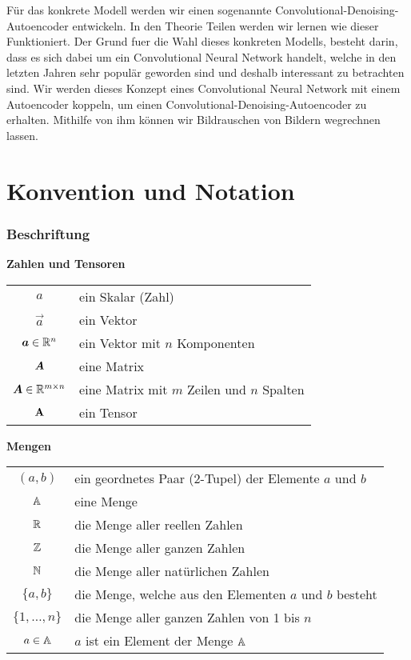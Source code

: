 Für das konkrete Modell werden wir einen sogenannte
Convolutional-Denoising-Autoencoder entwickeln. In den Theorie Teilen werden wir
lernen wie dieser Funktioniert. Der Grund fuer die Wahl dieses konkreten Modells,
besteht darin, dass es sich dabei um ein Convolutional Neural Network handelt,
welche in den letzten Jahren sehr populär geworden sind und deshalb interessant
zu betrachten sind. Wir werden dieses Konzept eines Convolutional Neural Network
mit einem Autoencoder koppeln, um einen Convolutional-Denoising-Autoencoder zu
erhalten. Mithilfe von ihm können wir Bildrauschen von Bildern wegrechnen lassen.


\chapter*{Konvention und Notation}

\subsection*{Beschriftung}

\begin{center}\textbf{Zahlen und Tensoren}\end{center}
\begin{tabular}{cl}
  $a$ & ein Skalar (Zahl) \\
  $\vec{a}$ & ein Vektor \\
  $\bm{a} \in \mathbb{R}^{n}$ & ein Vektor mit $n$ Komponenten \\
  $\bm{A}$ & eine Matrix \\
  $\bm{A} \in \mathbb{R}^{m \times n}$ & eine Matrix mit $m$ Zeilen und $n$ Spalten \\
  $\mathbf{A}$ & ein Tensor \\

\end{tabular}

\begin{center}\textbf{Mengen}\end{center}
\begin{tabular}{cl}
  $(a,b)$ & ein geordnetes Paar (2-Tupel) der Elemente $a$ und $b$ \\
  $\mathbb{A}$ & eine Menge \\
  $\mathbb{R}$ & die Menge aller reellen Zahlen \\
  $\mathbb{Z}$ & die Menge aller ganzen Zahlen \\
  $\mathbb{N}$ & die Menge aller natürlichen Zahlen \\
  $\{a,b\}$ & die Menge, welche aus den Elementen $a$ und $b$ besteht \\
  $\{1,\ldots,n\}$ & die Menge aller ganzen Zahlen von 1 bis $n$ \\
  $a \in \mathbb{A}$ & $a$ ist ein Element der Menge $\mathbb{A}$ \\

\end{tabular}

